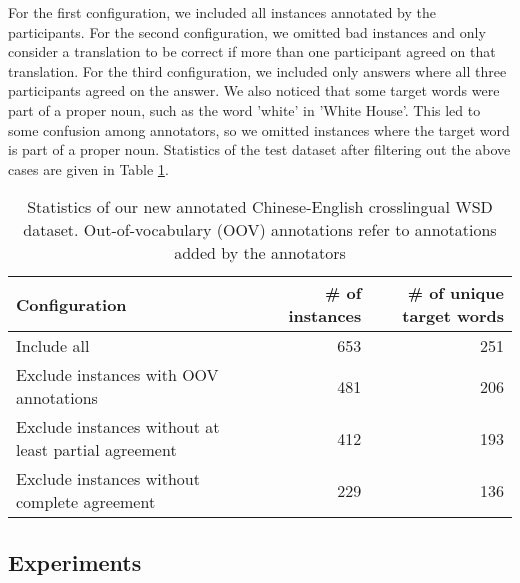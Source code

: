 {%

For the first configuration, we included all instances annotated by the participants. For the second configuration, we omitted bad instances and only consider a translation to be correct if more than one participant agreed on that translation. For the third configuration, we included only answers where all three participants agreed on the answer. We also noticed that some target words were part of a proper noun, such as the word 'white' in 'White House'. This led to some confusion among annotators, so we omitted instances where the target word is part of a proper noun. Statistics of the test dataset after filtering out the above cases are given in Table \ref{table:CLWSD-test-stats-no-ne}.

\begin{table}[ht]
	\caption{Statistics of our new annotated Chinese-English crosslingual WSD dataset. Out-of-vocabulary (OOV) annotations refer to annotations added by the annotators}
	\label{table:CLWSD-test-stats-no-ne}
	\begin{center}
		\begin{tabular}{| p{8cm} | r| r|}
			\hline
			Configuration & \# of instances & \# of unique target words \\
			\hline
			Include all & 653 & 251\\ 
			\hline
			Exclude instances with OOV annotations & 481 & 206 \\						
			\hline
			Exclude instances without at least partial agreement & 412 & 193 \\
			\hline
			Exclude instances without complete agreement & 229 & 136 \\
			\hline
		\end{tabular}
	\end{center}
\end{table}

\subsection{Experiments}

}
